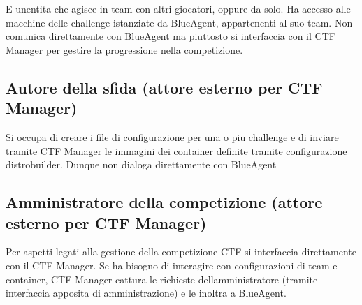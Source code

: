 E\textquotesingle{} un\textquotesingle entita che agisce in team con
altri giocatori, oppure da solo. Ha accesso alle macchine delle
challenge istanziate da BlueAgent, appartenenti al suo team. Non
comunica direttamente con BlueAgent ma piuttosto si interfaccia con il
CTF Manager per gestire la progressione nella competizione.

\subsection{Autore della sfida (attore esterno per CTF
Manager)}\label{autore-della-sfida-attore-esterno-per-ctf-manager}

Si occupa di creare i file di configurazione per una o piu challenge e
di inviare tramite CTF Manager le immagini dei container definite
tramite configurazione distrobuilder. Dunque non dialoga direttamente
con BlueAgent

\subsection{Amministratore della competizione (attore esterno per CTF
Manager)}\label{amministratore-della-competizione-attore-esterno-per-ctf-manager}

Per aspetti legati alla gestione della competizione CTF si interfaccia
direttamente con il CTF Manager. Se ha bisogno di interagire con
configurazioni di team e container, CTF Manager cattura le richieste
dell\textquotesingle amministratore (tramite interfaccia apposita di
amministrazione) e le inoltra a BlueAgent.
